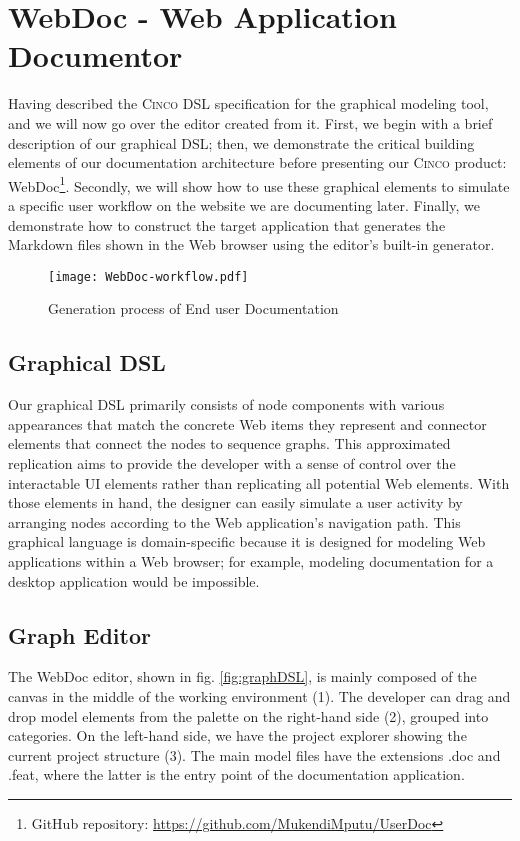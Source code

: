 \chapter{WebDoc - Web Application Documentor}\label{ch:CP}

Having described the \textsc{Cinco} DSL specification for the graphical modeling tool, and we will now go over the editor created from it. First, we begin with a brief description of our graphical DSL; then, we demonstrate the critical building elements of our documentation architecture before presenting our \textsc{Cinco} product: WebDoc\footnote{GitHub repository: \url{https://github.com/MukendiMputu/UserDoc}}. Secondly, we will show how to use these graphical elements to simulate a specific user workflow on the website we are documenting later. Finally, we demonstrate how to construct the target application that generates the Markdown files shown in the Web browser using the editor's built-in generator.

\begin{figure}[h]
    \centering
    \texttt{[image: WebDoc-workflow.pdf]}
    \caption{Generation process of End user Documentation}
    \label{fig:WebDocWorkflow}
\end{figure}

\section{Graphical DSL}\label{sec:gDSL}

Our graphical DSL primarily consists of node components with various appearances that match the concrete Web items they represent and connector elements that connect the nodes to sequence graphs. This approximated replication aims to provide the developer with a sense of control over the interactable UI elements rather than replicating all potential Web elements. With those elements in hand, the designer can easily simulate a user activity by arranging nodes according to the Web application's navigation path. This graphical language is domain-specific because it is designed for modeling Web applications within a Web browser; for example, modeling documentation for a desktop application would be impossible.

\section{Graph Editor}\label{sec:graphEditor}

The WebDoc editor, shown in fig. \ref{fig:graphDSL}, is mainly composed of the canvas in the middle of the working environment (1). The developer can drag and drop model elements from the palette on the right-hand side (2), grouped into categories. On the left-hand side, we have the project explorer showing the current project structure (3). The main model files have the extensions .doc and .feat, where the latter is the entry point of the documentation application.

